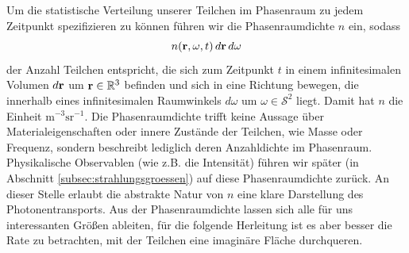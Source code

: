 	Um die statistische Verteilung unserer Teilchen im Phasenraum zu jedem Zeitpunkt spezifizieren zu können führen wir die Phasenraumdichte $n$ ein, sodass $$n(\mathbf{r},\omega,t)\,d\mathbf{r}\,d\omega$$ der Anzahl Teilchen entspricht, die sich zum Zeitpunkt $t$ in einem infinitesimalen Volumen $d\mathbf{r}$ um $\mathbf{r} \in \mathbb{R}^3$ befinden und sich in eine Richtung bewegen, die innerhalb eines infinitesimalen Raumwinkels $d\omega$ um $\omega \in \mathcal{S}^2$ liegt. Damit hat $n$ die Einheit $\text{m}^{-3}\text{sr}^{-1}$. Die Phasenraumdichte trifft keine Aussage über Materialeigenschaften oder innere Zustände der Teilchen, wie Masse oder Frequenz, sondern beschreibt lediglich deren Anzahldichte im Phasenraum. Physikalische Observablen (wie z.B. die Intensität) führen wir später (in Abschnitt \ref{subsec:strahlungsgroessen}) auf diese Phasenraumdichte zurück. An dieser Stelle erlaubt die abstrakte Natur von $n$ eine klare Darstellung des Photonentransports. Aus der Phasenraumdichte lassen sich alle für uns interessanten Größen ableiten, für die folgende Herleitung ist es aber besser die Rate zu betrachten, mit der Teilchen eine imaginäre Fläche durchqueren.
	
